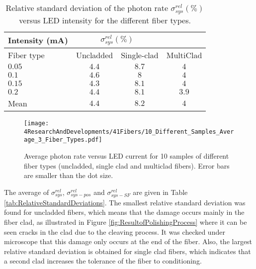 \begin{table}[h]
\centering{}%
\begin{tabular}{lccc}
\toprule 
Intensity (mA) & \multicolumn{2}{c}{$\sigma^{rel}_{sys}(\%)$} \tabularnewline
\midrule
Fiber type & Uncladded & Single-clad & MultiClad \tabularnewline
\midrule
\midrule
$0.05$ & $4.4$ & $8.7$ & $4$ \tabularnewline
$0.1$ & $4.6$ & $8$ & $4$ \tabularnewline
$0.15$ & $4.3$ & $8.1$ & $4$ \tabularnewline
$0.2$ & $4.4$ & $8.1$ & $3.9$ \tabularnewline
\midrule 
Mean & $4.4$ & $8.2$ & $4$ \tabularnewline
\bottomrule
\end{tabular}
\caption{Relative standard deviation of the photon rate $\sigma^{rel}_{sys}(\%)$ versus LED intensity for the different fiber types.}
\label{tab:RelativeStandardDeviation3FiberTypes}
\end{table}

\begin{figure}[h]
\centering
\texttt{[image: 4ResearchAndDevelopments/41Fibers/10\_Different\_Samples\_Average\_3\_Fiber\_Types.pdf]}
\caption{Average photon rate versus LED current for 10 samples of different fiber types (uncladded, single clad and multiclad fibers). Error bars are smaller than the dot size.\label{fig:AveregeThreeFiberTypes}}
\end{figure}



The average of $\sigma^{rel}_{sys}$, $\sigma^{rel}_{sys-pos}$ and $\sigma^{rel}_{sys-SF}$ are given in Table \ref{tab:RelativeStandardDeviations}. The smallest relative standard deviation was found for uncladded fibers, which means that the damage occurs mainly in the fiber clad, as illustrated in Figure \ref{fig:ResultofPolishingProcess} where it can be seen cracks in the clad due to the cleaving process. It was checked under microscope that this damage only occurs at the end of the fiber. Also, the largest relative standard deviation is obtained for single clad fibers, which indicates that a second clad increases the tolerance of the fiber to conditioning.

